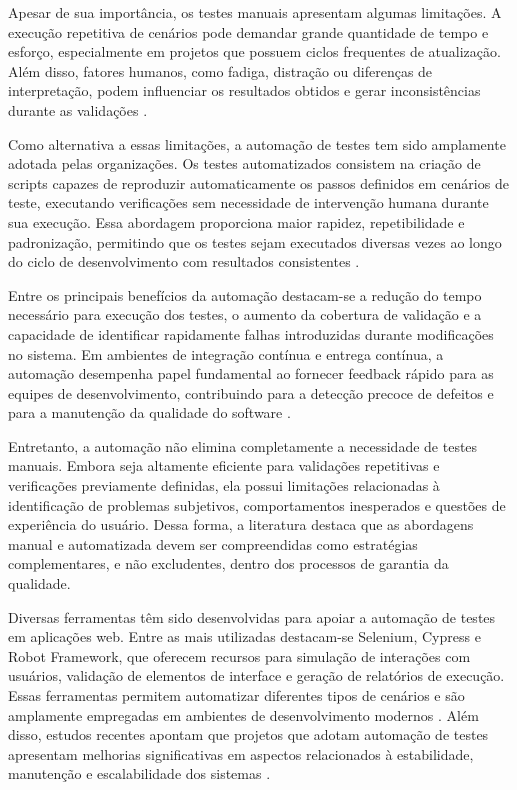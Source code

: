\documentclass{UNESC}
\begin{document}
Apesar de sua importância, os testes manuais apresentam algumas limitações. A execução repetitiva de cenários pode demandar grande quantidade de tempo e esforço, especialmente em projetos que possuem ciclos frequentes de atualização. Além disso, fatores humanos, como fadiga, distração ou diferenças de interpretação, podem influenciar os resultados obtidos e gerar inconsistências durante as validações \cite{gandini2002}.

Como alternativa a essas limitações, a automação de testes tem sido amplamente adotada pelas organizações. Os testes automatizados consistem na criação de scripts capazes de reproduzir automaticamente os passos definidos em cenários de teste, executando verificações sem necessidade de intervenção humana durante sua execução. Essa abordagem proporciona maior rapidez, repetibilidade e padronização, permitindo que os testes sejam executados diversas vezes ao longo do ciclo de desenvolvimento com resultados consistentes \cite{SOMMERVILE}.

Entre os principais benefícios da automação destacam-se a redução do tempo necessário para execução dos testes, o aumento da cobertura de validação e a capacidade de identificar rapidamente falhas introduzidas durante modificações no sistema. Em ambientes de integração contínua e entrega contínua, a automação desempenha papel fundamental ao fornecer feedback rápido para as equipes de desenvolvimento, contribuindo para a detecção precoce de defeitos e para a manutenção da qualidade do software \cite{souza_automacao_2023}.

Entretanto, a automação não elimina completamente a necessidade de testes manuais. Embora seja altamente eficiente para validações repetitivas e verificações previamente definidas, ela possui limitações relacionadas à identificação de problemas subjetivos, comportamentos inesperados e questões de experiência do usuário. Dessa forma, a literatura destaca que as abordagens manual e automatizada devem ser compreendidas como estratégias complementares, e não excludentes, dentro dos processos de garantia da qualidade.

Diversas ferramentas têm sido desenvolvidas para apoiar a automação de testes em aplicações web. Entre as mais utilizadas destacam-se Selenium, Cypress e Robot Framework, que oferecem recursos para simulação de interações com usuários, validação de elementos de interface e geração de relatórios de execução. Essas ferramentas permitem automatizar diferentes tipos de cenários e são amplamente empregadas em ambientes de desenvolvimento modernos \cite{souza_automacao_2023}. Além disso, estudos recentes apontam que projetos que adotam automação de testes apresentam melhorias significativas em aspectos relacionados à estabilidade, manutenção e escalabilidade dos sistemas \cite{matos2020esus}.
\end{document}
